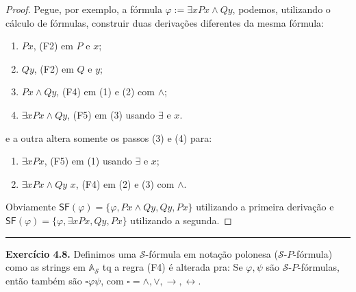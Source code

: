 \documentclass[11pt]{article}
\theoremstyle{definition}
\newcommand{\mc}[1]{\mathcal{#1}}
\newcommand{\msf}[1]{\mathsf{#1}}
\newcommand{\mbb}[1]{\mathbb{#1}}
\begin{document}
\begin{proof}
    Pegue, por exemplo, a fórmula $\varphi:=\exists xPx\wedge Qy$, podemos, utilizando o cálculo de fórmulas, construir duas derivações diferentes da mesma fórmula:
    \begin{enumerate}
        \item $Px$, (F2) em $P$ e $x$;
        \item $Qy$, (F2) em $Q$ e $y$;
        \item $Px\wedge Qy$, (F4) em (1) e (2) com $\wedge$;
        \item $\exists xPx\wedge Qy$, (F5) em (3) usando $\exists$ e $x$.
    \end{enumerate}
    e a outra altera somente os passos (3) e (4) para:
    \begin{enumerate}
        \item $\exists xPx$, (F5) em (1) usando $\exists$ e $x$;
        \item $\exists xPx\wedge Qy$ $x$, (F4) em (2) e (3) com $\wedge$.
    \end{enumerate}
    Obviamente $\msf{SF}(\varphi)=\{\varphi,Px\wedge Qy,Qy,Px\}$ utilizando a primeira derivação e $\msf{SF}(\varphi)=\{\varphi, \exists xPx, Qy, Px\}$ utilizando a segunda.
\end{proof}

\hrule

\textbf{Exercício 4.8.} Definimos uma $\mc{S}$-fórmula em notação polonesa ($\mc{S}$-$P$-fórmula) como as strings em $\mbb{A}_{\mc{S}}$ tq a regra (F4) é alterada pra: Se $\varphi,\psi$ são $\mc{S}$-$P$-fórmulas, então também são $\square\varphi\psi$, com $\square=\wedge,\vee,\to,\leftrightarrow$.
\end{document}
